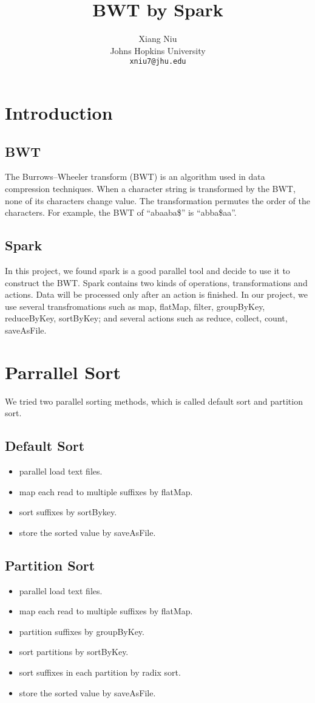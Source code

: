 \documentclass[11pt,letterpaper]{article}
\title{BWT by Spark}
\author{Xiang Niu\\
  Johns Hopkins University\\
  {\tt xniu7@jhu.edu}}
\date{}
\begin{document}
\maketitle

\section{Introduction}

\subsection{BWT}
The Burrows–Wheeler transform (BWT) is an algorithm used in data compression techniques. When a character string is transformed by the BWT, none of its characters change value. The transformation permutes the order of the characters. For example, the BWT of ``abaaba\$'' is ``abba\$aa''.

\subsection{Spark}
In this project, we found spark is a good parallel tool and decide to use it to construct the BWT. Spark contains two kinds of operations, transformations and actions. Data will be processed only after an action is finished. In our project, we use several transfromations such as map, flatMap, filter, groupByKey, reduceByKey, sortByKey; and several actions such as reduce, collect, count, saveAsFile.

\section{Parrallel Sort}
We tried two parallel sorting methods, which is called default sort and partition sort.

\subsection{Default Sort}
\begin{itemize}
	\item
	parallel load text files.
	\item
	map each read to multiple suffixes by flatMap.
	\item
	sort suffixes by sortBykey.
	\item
	store the sorted value by saveAsFile.
\end{itemize}

\subsection{Partition Sort}
\begin{itemize}
	\item
	parallel load text files.
	\item
	map each read to multiple suffixes by flatMap.
	\item
	partition suffixes by groupByKey.
	\item
	sort partitions by sortByKey.
	\item
	sort suffixes in each partition by radix sort.
	\item
	store the sorted value by saveAsFile.
\end{itemize}
\end{document}
